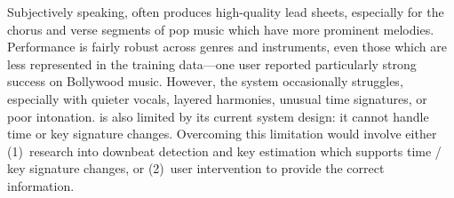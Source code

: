 Subjectively speaking, \sheetsage{} often produces high-quality lead sheets, especially for the chorus and verse segments of pop music which have more prominent melodies. 
Performance is fairly robust across genres and instruments, even those which are less represented in the training data---one user reported particularly strong success on Bollywood music. 
However, the system occasionally struggles, especially with quieter vocals, layered harmonies, unusual time signatures, or poor intonation. 
\sheetsage{} is also limited by its current system design: it cannot handle time or key signature changes.
Overcoming this limitation would involve either (1)~research into downbeat detection and key estimation which supports time / key signature changes, or (2)~user intervention to provide the correct information.